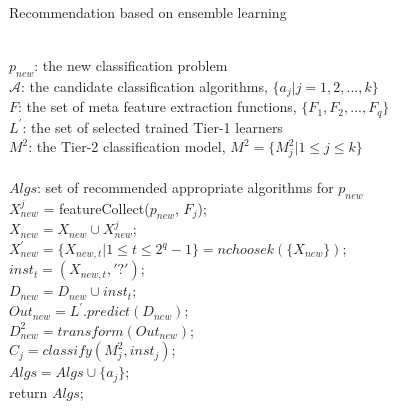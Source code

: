 \documentclass[review,3p,twocolumn,times]{elsarticle}
\begin{document}
\begin{algorithm}[!h]
	\footnotesize
	\caption{Recommendation based on ensemble learning}\label{algo:recommendation}
	
	\begin{algorithmic}[1]
		\REQUIRE ~~\\
		$p_{new}$: the new classification problem \\
		$\mathcal{A}$: the candidate classification algorithms, $\{a_j|j=1, 2, ..., k\}$ \\
		$F$: the set of meta feature extraction functions, $\{F_1, F_2, ..., F_q\}$\\ 
		$L^{'}$: the set of selected trained Tier-1 learners\\
		$M^2$: the Tier-2 classification model, $M^2 =\{M^2_j|1 \leq j \leq k\}$\\
		\ENSURE ~~\\
		$Algs$: set of recommended appropriate algorithms for $p_{new}$\\
		\STATE $X_{new}^j$ = featureCollect($p_{new}$, $F_j$);\\
		\STATE $X_{new} = X_{new} \cup X_{new}^j$;\\
		\ENDFOR
		\STATE $X_{new}^{'} = \{X_{new,t} | 1 \leq t \leq 2^q - 1\} = nchoosek(\{X_{new}\})$;\\
		\STATE $inst_t = (X_{new,t}, '?')$;\\
		\STATE $D_{new} = D_{new} \cup {inst_t}$;\\
		\ENDFOR
		\STATE $Out_{new} = L^{'}.predict(D_{new})$;\\
		\STATE $D^2_{new} = transform(Out_{new})$;\\	
		\STATE $C_j = classify(M^2_j, inst_j)$;\\
		\STATE $Algs = Algs \cup \{a_j\}$;\\
		\ENDIF
		\ENDFOR
		\STATE return $Algs$;\\
	\end{algorithmic}
\end{algorithm}
\end{document}
